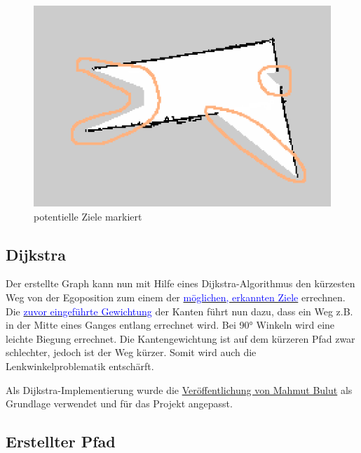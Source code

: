\begin{figure}[h]
\begin{center}
\includegraphics[width=15cm]{images/chapter5/MapUebergaenge_Markiert.png}
\caption{potentielle Ziele markiert}
\label{Map_aus_Graph}
\end{center}
\end{figure}



\subsection{Dijkstra}


Der erstellte Graph kann nun mit Hilfe eines Dijkstra-Algorithmus den kürzesten Weg von der Egoposition zum einem der 
\hyperref[sec:ziele]{\textcolor{blue}{möglichen, erkannten Ziele}} errechnen. Die \hyperref[sec:gewichtung]{\textcolor{blue}{zuvor eingeführte Gewichtung}} der Kanten führt nun dazu, dass ein Weg z.B. in der Mitte eines Ganges entlang errechnet wird. Bei 90° Winkeln wird eine leichte Biegung errechnet. Die Kantengewichtung ist auf dem kürzeren Pfad zwar schlechter, jedoch ist der Weg kürzer. Somit wird auch die Lenkwinkelproblematik entschärft. 

Als Dijkstra-Implementierung wurde die \href{https://gist.github.com/vertexclique/7410577}{Veröffentlichung von Mahmut Bulut} als Grundlage verwendet und für das Projekt angepasst.



\subsection{Erstellter Pfad}

